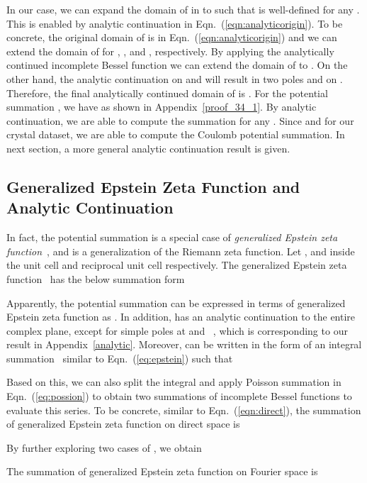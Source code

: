 \documentclass[nohyperref]{article}
\theoremstyle{plain}
\theoremstyle{definition}
\theoremstyle{remark}
\begin{document}
In our case, we can expand the domain of  in  to  such that  is well-defined for any . This is enabled by analytic continuation in Eqn.~(\ref{eqn:analyticorigin}). To be concrete, the original domain of  is  in Eqn.~(\ref{eqn:analyticorigin}) and we can extend the domain of  for , , and , respectively. By applying the analytically continued incomplete Bessel function we can extend the domain of  to . On the other hand, the analytic continuation on  and  will result in two poles  and  on . Therefore, the final analytically continued domain of  is . For the potential summation , we have  as shown in Appendix~\ref{proof_34_1}. By analytic continuation, we are able to compute the summation for any . Since  and  for our crystal dataset, we are able to compute the Coulomb potential summation. In next section, a more general analytic continuation result  is given. 


\subsection{Generalized Epstein Zeta Function and Analytic Continuation}
\label{sec:zeta}

In fact, the potential summation  is a special case of \textit{generalized Epstein zeta function}~\citep{crandall1987elementary, terras1973bessel, epstein}, and is a generalization of the Riemann zeta function. Let ,  and  inside the unit cell and reciprocal unit cell respectively. The generalized Epstein zeta function~\citep{epstein} has the below summation form

Apparently, the potential summation  can be expressed in terms of generalized Epstein zeta function as . In addition,  has an analytic continuation to the entire complex plane, except for simple poles at  and ~\citep{crandall1987elementary}, which is corresponding to our result in Appendix~\ref{analytic}. Moreover,  can be written in the form of an integral summation~\citep{epstein} similar to Eqn.~(\ref{eq:epstein}) such that

Based on this, we can also split the integral and apply Poisson summation in Eqn.~(\ref{eq:possion}) to obtain two summations of incomplete Bessel functions to evaluate this series. To be concrete, similar to Eqn.~(\ref{eqn:direct}), the summation of generalized Epstein zeta function on direct space is

By further exploring two cases of , we obtain

The summation of generalized Epstein zeta function on Fourier space is
\end{document}
